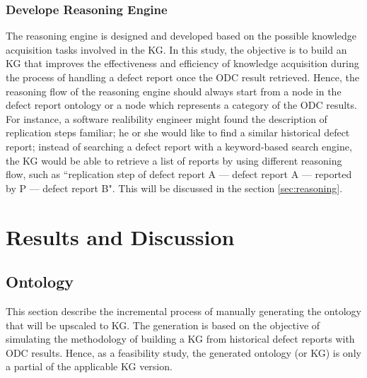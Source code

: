 \documentclass[12pt] {article}
\begin{document}
\subsubsection{Develope Reasoning Engine}
The reasoning engine is designed and developed based on the possible knowledge acquisition tasks involved in the KG.
In this study, the objective is to build an KG that improves the effectiveness and efficiency of knowledge acquisition during the process of handling a defect report once the ODC result retrieved.
Hence, the reasoning flow of the reasoning engine should always start from a node in the defect report ontology or a node which represents a category of the ODC results.
For instance, a software realibility engineer might found the description of replication steps familiar; he or she would like to find a similar historical defect report; instead of searching a defect report with a keyword-based search engine, the KG would be able to retrieve a list of reports by using different reasoning flow, such as ``replication step of defect report A --- defect report A --- reported by P --- defect report B".
This will be discussed in the section \ref{sec:reasoning}.

\section{Results and Discussion}
\subsection{Ontology}
This section describe the incremental process of manually generating the ontology that will be upscaled to KG.
The generation is based on the objective of simulating the methodology of building a KG from historical defect reports with ODC results.
Hence, as a feasibility study, the generated ontology (or KG) is only a partial of the applicable KG version.
\end{document}
